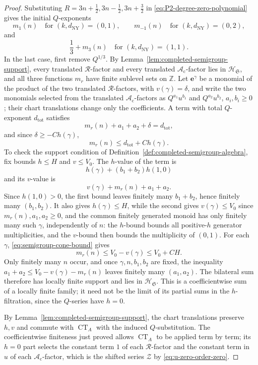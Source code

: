 \documentclass[10pt,a4paper]{amsart}
\newcommand{\Z}{\mathbb Z}
\begin{document}
\begin{proof}
Substituting \(R=3n+\tfrac12,3n-\tfrac12,3n+\tfrac32\) in \eqref{eq:P2-degree-zero-polynomial} gives the initial \(Q\)-exponents
\[
 m_1(n)
 \quad\text{for }(k,d_{\mathrm{NY}})=(0,1),\qquad
 m_{-1}(n)
 \quad\text{for }(k,d_{\mathrm{NY}})=(0,2),
\]
and
\[
 \frac13+m_3(n)
 \quad\text{for }(k,d_{\mathrm{NY}})=(1,1).
\]
In the last case, first remove \(Q^{1/3}\).  By Lemma~\ref{lem:completed-semigroup-support}, every translated \(\mathcal R\)-factor and every translated \(\mathscr A_{\mathrm c}\)-factor lies in \(\mathscr H_{\mathfrak S}\), and all three functions \(m_r\) have finite sublevel sets on \(\Z\).  Let \(\mathbf e^\gamma\) be a monomial of the product of the two translated \(\mathcal R\)-factors, with \(v(\gamma)=\delta\), and write the two monomials selected from the translated \(\mathscr A_{\mathrm c}\)-factors as \(Q^{a_1}u^{b_1}\) and \(Q^{a_2}u^{b_2}\), \(a_i,b_i\geq0\); their chart translations change only the coefficients.  A term with total \(Q\)-exponent \(d_{\mathrm{tot}}\) satisfies
\[
 m_r(n)+a_1+a_2+\delta=d_{\mathrm{tot}},
\]
and since \(\delta\geq-Ch(\gamma)\),
\[
 m_r(n)\leq d_{\mathrm{tot}}+Ch(\gamma).
\]
To check the support condition of Definition~\ref{def:completed-semigroup-algebra}, fix bounds \(h\leq H\) and \(v\leq V_0\).  The \(h\)-value of the term is
\[
 h(\gamma)+(b_1+b_2)h(1,0)
\]
and its \(v\)-value is
\[
 v(\gamma)+m_r(n)+a_1+a_2.
\]
Since \(h(1,0)>0\), the first bound leaves finitely many \(b_1+b_2\), hence finitely many \((b_1,b_2)\).  It also gives \(h(\gamma)\leq H\), while the second gives \(v(\gamma)\leq V_0\) since \(m_r(n),a_1,a_2\geq0\), and the common finitely generated monoid has only finitely many such \(\gamma\), independently of \(n\): the \(h\)-bound bounds all positive-\(h\) generator multiplicities, and the \(v\)-bound then bounds the multiplicity of \((0,1)\).  For each \(\gamma\), \eqref{eq:semigroup-cone-bound} gives
\[
 m_r(n)\leq V_0-v(\gamma)\leq V_0+CH.
\]
Only finitely many \(n\) occur, and once \(\gamma,n,b_1,b_2\) are fixed, the inequality \(a_1+a_2\leq V_0-v(\gamma)-m_r(n)\) leaves finitely many \((a_1,a_2)\).  The bilateral sum therefore has locally finite support and lies in \(\mathscr H_{\mathfrak S}\).  This is a coefficientwise sum of a locally finite family; it need not be the limit of its partial sums in the \(h\)-filtration, since the \(Q\)-series have \(h=0\).

By Lemma~\ref{lem:completed-semigroup-support}, the chart translations preserve \(h,v\) and commute with \(\operatorname{CT}_A\) with the induced \(Q\)-substitution.  The coefficientwise finiteness just proved allows \(\operatorname{CT}_A\) to be applied term by term; its \(h=0\) part selects the constant term \(1\) of each \(\mathcal R\)-factor and the constant term in \(u\) of each \(\mathscr A_{\mathrm c}\)-factor, which is the shifted series \(\mathcal Z\) by \eqref{eq:u-zero-order-zero}.
\end{proof}
\end{document}
